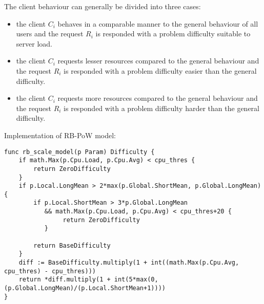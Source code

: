 The client behaviour can generally be divided into three cases:
\begin{itemize}
\item the client $C_i$ behaves in a comparable manner to the general behaviour of all users and the request $R_i$ is responded with a problem difficulty suitable to server load.
\item the client $C_i$ requests lesser resources compared to the general behaviour and the request $R_i$ is responded with a problem difficulty easier than the general difficulty.
\item the client $C_i$ requests more resources compared to the general behaviour and the request $R_i$ is responded with a problem difficulty harder than the general difficulty.
\end{itemize}
Implementation of RB-PoW model:
\begin{verbatim}
func rb_scale_model(p Param) Difficulty {
	if math.Max(p.Cpu.Load, p.Cpu.Avg) < cpu_thres {
		return ZeroDifficulty
	}
	if p.Local.LongMean > 2*max(p.Global.ShortMean, p.Global.LongMean) {
		if p.Local.ShortMean > 3*p.Global.LongMean 
		   && math.Max(p.Cpu.Load, p.Cpu.Avg) < cpu_thres+20 {
		    	return ZeroDifficulty
		   }

		return BaseDifficulty
	}
	diff := BaseDifficulty.multiply(1 + int((math.Max(p.Cpu.Avg, cpu_thres) - cpu_thres)))
	return *diff.multiply(1 + int(5*max(0, (p.Global.LongMean)/(p.Local.ShortMean+1))))
}
\end{verbatim}









